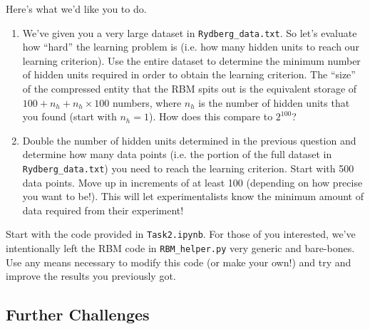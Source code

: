 \documentclass[12pt]{article}
\begin{document}
Here's what we'd like you to do.
\begin{enumerate}
    \item We've given you a very large dataset in \texttt{Rydberg\_data.txt}. So let's evaluate how ``hard'' the learning problem is (i.e. how many hidden units to reach our learning criterion). Use the entire dataset to determine the minimum number of hidden units required in order to obtain the learning criterion. The ``size'' of the compressed entity that the RBM spits out is the equivalent storage of $100 + n_h + n_h \times 100$ numbers, where $n_h$ is the number of hidden units that you found (start with $n_h = 1$). How does this compare to $2^{100}$? 
    \item Double the number of hidden units determined in the previous question and determine how many data points (i.e. the portion of the full dataset in \texttt{Rydberg\_data.txt}) you need to reach the learning criterion. Start with 500 data points. Move up in increments of at least 100 (depending on how precise you want to be!). This will let experimentalists know the minimum amount of data required from their experiment!
\end{enumerate}

Start with the code provided in \texttt{Task2.ipynb}. For those of you interested, we've intentionally left the RBM code in \texttt{RBM\_helper.py} very generic and bare-bones. Use any means necessary to modify this code (or make your own!) and try and improve the results you previously got.

\subsection*{Further Challenges} \label{sec:challenges}
\end{document}
